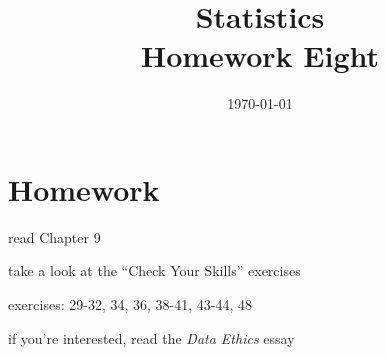 \documentclass[letterpaper]{exam}
\title{Statistics \\ Homework Eight}
\date{\today}
\author{}
\begin{document}
  \maketitle

  \section{Homework}
    \begin{itemize*}
      \item read Chapter 9 
      \item take a look at the ``Check Your Skills'' exercises
      \item exercises: 29-32, 34, 36, 38-41, 43-44, 48
      \item if you're interested, read the {\em Data Ethics} essay
    \end{itemize*}
\end{document}
